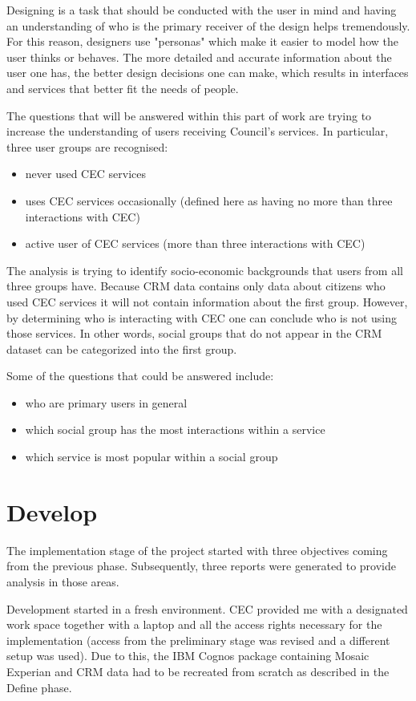 Designing is a task that should be conducted with the user in mind and having an understanding of who is the primary receiver of the design helps tremendously. For this reason, designers use "personas" which make it easier to model how the user thinks or behaves. The more detailed and accurate information about the user one has, the  better design decisions one can make, which results in interfaces and services that better fit the needs of people.

The questions that will be answered within this part of work are trying to increase the understanding of users receiving Council's services. In particular, three user groups are recognised:
\begin{itemize}
\item never used CEC services
\item uses CEC services occasionally (defined here as having no more than three interactions with CEC)
\item active user of CEC services (more than three interactions with CEC)
\end{itemize}

The analysis is trying to identify socio-economic backgrounds that users from all three groups have. Because CRM data contains only data about citizens who used CEC services it will not contain information about the first group. However, by determining who is interacting with CEC one can conclude who is not using those services. In other words, social groups that do not appear in the CRM dataset can be categorized into the first group.

Some of the questions that could be answered include:
\begin{itemize}
\item who are primary users in general
\item which social group has the most interactions within a service
\item which service is most popular within a social group
\end{itemize}

	\section{Develop}
	
The implementation stage of the project started with three objectives coming from the previous phase. Subsequently, three reports were generated to provide analysis in those areas.

Development started in a fresh environment. CEC provided me with a designated work space together with a laptop and all the access rights necessary for the implementation (access from the preliminary stage was revised and a different setup was used). Due to this, the IBM Cognos package containing Mosaic Experian and CRM data had to be recreated from scratch as described in the Define phase.

